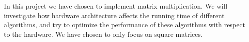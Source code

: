 In this project we have chosen to implement matrix multiplication. We
will investigate how hardware architecture affects the running time of
different algorithms, and try to optimize the performance of these
algorithms with respect to the hardware. We have chosen to only focus on square matrices.